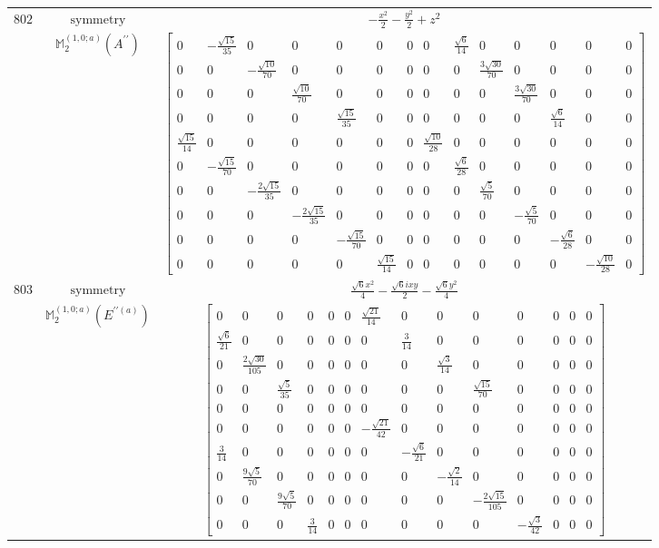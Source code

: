\documentclass[fleqn,8pt,landscape]{jsarticle}
\begin{document}
\begin{longtable}{ccc}
$ 802 $ & $ \text{symmetry} $ & $ - \frac{x^{2}}{2} - \frac{y^{2}}{2} + z^{2} $ \\
$  $ & $ \mathbb{M}_{2}^{(1,0;a)}(A^{\prime\prime}) $ & $ \begin{bmatrix} 0 & - \frac{\sqrt{15}}{35} & 0 & 0 & 0 & 0 & 0 & 0 & \frac{\sqrt{6}}{14} & 0 & 0 & 0 & 0 & 0 \\ 0 & 0 & - \frac{\sqrt{10}}{70} & 0 & 0 & 0 & 0 & 0 & 0 & \frac{3 \sqrt{30}}{70} & 0 & 0 & 0 & 0 \\ 0 & 0 & 0 & \frac{\sqrt{10}}{70} & 0 & 0 & 0 & 0 & 0 & 0 & \frac{3 \sqrt{30}}{70} & 0 & 0 & 0 \\ 0 & 0 & 0 & 0 & \frac{\sqrt{15}}{35} & 0 & 0 & 0 & 0 & 0 & 0 & \frac{\sqrt{6}}{14} & 0 & 0 \\ \frac{\sqrt{15}}{14} & 0 & 0 & 0 & 0 & 0 & 0 & \frac{\sqrt{10}}{28} & 0 & 0 & 0 & 0 & 0 & 0 \\ 0 & - \frac{\sqrt{15}}{70} & 0 & 0 & 0 & 0 & 0 & 0 & \frac{\sqrt{6}}{28} & 0 & 0 & 0 & 0 & 0 \\ 0 & 0 & - \frac{2 \sqrt{15}}{35} & 0 & 0 & 0 & 0 & 0 & 0 & \frac{\sqrt{5}}{70} & 0 & 0 & 0 & 0 \\ 0 & 0 & 0 & - \frac{2 \sqrt{15}}{35} & 0 & 0 & 0 & 0 & 0 & 0 & - \frac{\sqrt{5}}{70} & 0 & 0 & 0 \\ 0 & 0 & 0 & 0 & - \frac{\sqrt{15}}{70} & 0 & 0 & 0 & 0 & 0 & 0 & - \frac{\sqrt{6}}{28} & 0 & 0 \\ 0 & 0 & 0 & 0 & 0 & \frac{\sqrt{15}}{14} & 0 & 0 & 0 & 0 & 0 & 0 & - \frac{\sqrt{10}}{28} & 0 \end{bmatrix} $ \\ \hline
$ 803 $ & $ \text{symmetry} $ & $ \frac{\sqrt{6} x^{2}}{4} - \frac{\sqrt{6} i x y}{2} - \frac{\sqrt{6} y^{2}}{4} $ \\
$  $ & $ \mathbb{M}_{2}^{(1,0;a)}(E^{\prime\prime(a)}) $ & $ \begin{bmatrix} 0 & 0 & 0 & 0 & 0 & 0 & \frac{\sqrt{21}}{14} & 0 & 0 & 0 & 0 & 0 & 0 & 0 \\ \frac{\sqrt{6}}{21} & 0 & 0 & 0 & 0 & 0 & 0 & \frac{3}{14} & 0 & 0 & 0 & 0 & 0 & 0 \\ 0 & \frac{2 \sqrt{30}}{105} & 0 & 0 & 0 & 0 & 0 & 0 & \frac{\sqrt{3}}{14} & 0 & 0 & 0 & 0 & 0 \\ 0 & 0 & \frac{\sqrt{5}}{35} & 0 & 0 & 0 & 0 & 0 & 0 & \frac{\sqrt{15}}{70} & 0 & 0 & 0 & 0 \\ 0 & 0 & 0 & 0 & 0 & 0 & 0 & 0 & 0 & 0 & 0 & 0 & 0 & 0 \\ 0 & 0 & 0 & 0 & 0 & 0 & - \frac{\sqrt{21}}{42} & 0 & 0 & 0 & 0 & 0 & 0 & 0 \\ \frac{3}{14} & 0 & 0 & 0 & 0 & 0 & 0 & - \frac{\sqrt{6}}{21} & 0 & 0 & 0 & 0 & 0 & 0 \\ 0 & \frac{9 \sqrt{5}}{70} & 0 & 0 & 0 & 0 & 0 & 0 & - \frac{\sqrt{2}}{14} & 0 & 0 & 0 & 0 & 0 \\ 0 & 0 & \frac{9 \sqrt{5}}{70} & 0 & 0 & 0 & 0 & 0 & 0 & - \frac{2 \sqrt{15}}{105} & 0 & 0 & 0 & 0 \\ 0 & 0 & 0 & \frac{3}{14} & 0 & 0 & 0 & 0 & 0 & 0 & - \frac{\sqrt{3}}{42} & 0 & 0 & 0 \end{bmatrix} $ \\ \hline

\end{longtable}
\end{document}
